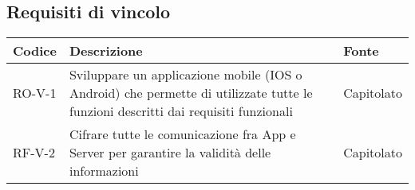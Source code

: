 \subsection{Requisiti di vincolo}
\begin{center}
\renewcommand{\arraystretch}{1.8} %
\begin{tabular}{ | m{8em} | m{18em} | m{12em} | }
\hline
Codice&Descrizione&Fonte\\
\hline
RO-V-1&Sviluppare un applicazione mobile (IOS o Android) che permette di utilizzate tutte le funzioni descritti dai requisiti funzionali&Capitolato\\
\hline
RF-V-2&Cifrare tutte le comunicazione fra App e Server per garantire la validità delle informazioni&Capitolato\\
\hline
\end{tabular}
\end{center}

